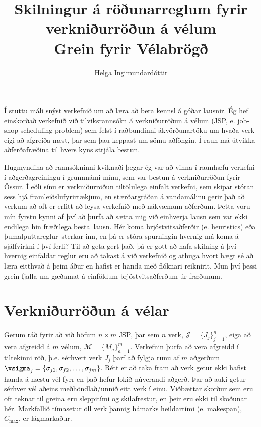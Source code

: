 \documentclass[10pt,a4paper]{article}
\title{Skilningur á röðunarreglum fyrir verkniðurröðun á vélum\\ 
    \vspace{6pt}
    \small Grein fyrir Vélabrögð} %
\author{Helga Ingimundardóttir}
\begin{document}
\maketitle


Í stuttu máli snýst verkefnið um að læra að bera kennsl á góðar lausnir. 
Ég hef einskorðað verkefnið við tilviksrannsókn á verkniðurröðun á vélum (JSP, 
e. job-shop scheduling problem) 
sem felst í raðbundinni ákvörðunartöku um hvaða verk eigi að afgreiða næst, þar 
sem þau keppast um sömu aðföngin.
Í raun má útvíkka aðferðafræðina til hvers kyns strjála bestun. 

Hugmyndina að rannsókninni kviknaði þegar ég var að vinna í raunhæfu verkefni í 
aðgerðagreiningu í grunnnámi mínu, sem var bestun á verkniðurröðun fyrir 
Össur. Í eðli sínu er verkniðurröðun tiltölulega einfalt verkefni, sem skipar 
stóran sess hjá framleiðslufyrirtækjum, en stærðargráðan á vandamálinu gerir 
það að verkum að oft er erfitt að leysa verkefnið með nákvæmum aðferðum. 
Þetta voru mín fyrstu kynni af því að þurfa að sætta mig við einhverja lausn 
sem var ekki endilega hin fræðilega \glqq besta\grqq\ lausn. 
Hér koma brjóstvitsaðferðir (e. heuristics) eða \glqq þumalputtareglur\grqq\ 
sterkar 
inn, en þá er stóra spurningin hvernig má koma á sjálfvirkni í því ferli? 
Til að geta gert það, þá er gott að hafa skilning á því hvernig einfaldar 
reglur eru að takast á við verkefnið og athuga hvort hægt sé að læra eitthvað á 
þeim áður en hafist er handa með flóknari reiknirit. 
Mun því þessi grein fjalla um gæðamat á einföldum brjóstvitsaðferðum úr 
fræðunum. 

\section*{Verkniðurröðun á vélar}
Gerum ráð fyrir að við höfum $n\times m$ JSP, 
þar sem $n$ verk, $\mathcal{J}=\{J_j\}_{j=1}^n$, 
eiga að vera afgreidd á $m$ vélum, $\mathcal{M}=\{M_a\}_{a=1}^m$. 
Verkefnin þurfa að vera afgreidd í tiltekinni röð, þ.e. sérhvert verk $J_j$ 
þarf að fylgja runu af $m$ aðgerðum 
$\vsigma_j=\{\sigma_{j1},\sigma_{j2},\dotsc,\sigma_{jm}\}$. 
Rétt er að taka fram að verk getur ekki hafist handa á næstu vél fyrr en það 
hefur lokið núverandi aðgerð. 
Þar að auki getur sérhver vél aðeins meðhöndlað/unnið eitt verk í einu. 
Viðbættar skorður sem eru oft teknar til greina eru sleppitími og skilafrestur, 
en þeir eru ekki til skoðunar hér.
Markfallið tímasetur öll verk þannig hámarks heildartími (e. makespan), 
$C_{\max}$, er lágmarkaður. 
\end{document}
